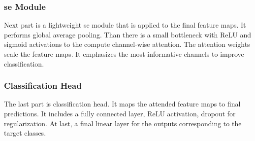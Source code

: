 \documentclass[conference]{IEEEtran}
\begin{document}

\subsubsection{\ac{se} Module}
Next part is a lightweight \ac{se} module that is applied to the final feature maps. It performs global average pooling. Than there is a small bottleneck with ReLU and sigmoid activations to the compute channel-wise attention. The attention weights scale the feature maps. It emphasizes the most informative channels to improve classification.




\subsubsection{Classification Head}
The last part is classification head. It maps the attended feature maps to final predictions. It includes a fully connected layer, ReLU activation, dropout for regularization. At last, a final linear layer for the outputs corresponding to the target classes.

\end{document}
